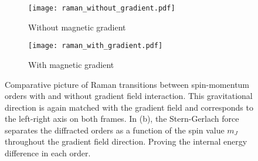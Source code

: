 \begin{figure}[!htbp]
	\centering
	\begin{subfigure}{.5\textwidth}
		\centering
		\texttt{[image: raman\_without\_gradient.pdf]}
		\caption{Without magnetic gradient}
		\label{fig:raman_without_gradient}
	\end{subfigure}%
	\begin{subfigure}{.5\textwidth}
		\centering
		\texttt{[image: raman\_with\_gradient.pdf]}
		\caption{With magnetic gradient}
		\label{fig:raman_with_gradient}
	\end{subfigure}
	\caption[Comparative picture of Raman transitions between spin-momentum orders with and without gradient field interaction]{Comparative picture of Raman transitions between spin-momentum orders with and without gradient field interaction. This gravitational direction is again matched with the gradient field and corresponds to the left-right axis on both frames. In (b), the Stern-Gerlach force separates the diffracted orders as a function of the spin value $m_J$ throughout the gradient field direction. Proving the internal energy difference in each order. }
	\label{fig:raman_gradient}
\end{figure}

